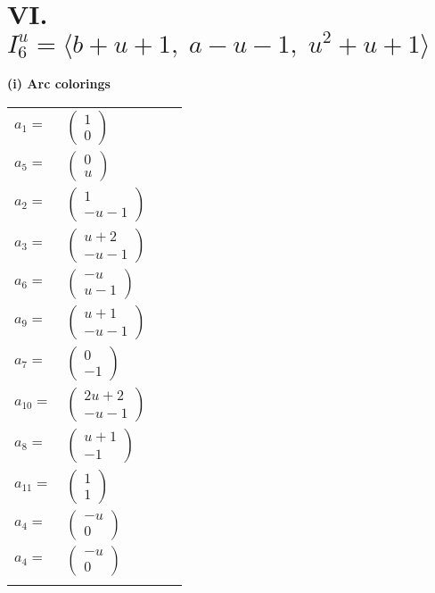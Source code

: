 \documentclass[1p]{elsarticle_modified}
\theoremstyle{definition}
\begin{document}
\centering \section*{VI. $I^u_{6}= \langle b+u+1,\;a- u-1,\;u^2+u+1 \rangle$}
\flushleft \textbf{(i) Arc colorings}\\
\begin{tabular}{m{7pt} m{180pt} m{7pt} m{180pt} }
\flushright $a_{1}=$&$\begin{pmatrix}1\\0\end{pmatrix}$ \\
\flushright $a_{5}=$&$\begin{pmatrix}0\\u\end{pmatrix}$ \\
\flushright $a_{2}=$&$\begin{pmatrix}1\\- u-1\end{pmatrix}$ \\
\flushright $a_{3}=$&$\begin{pmatrix}u+2\\- u-1\end{pmatrix}$ \\
\flushright $a_{6}=$&$\begin{pmatrix}- u\\u-1\end{pmatrix}$ \\
\flushright $a_{9}=$&$\begin{pmatrix}u+1\\- u-1\end{pmatrix}$ \\
\flushright $a_{7}=$&$\begin{pmatrix}0\\-1\end{pmatrix}$ \\
\flushright $a_{10}=$&$\begin{pmatrix}2 u+2\\- u-1\end{pmatrix}$ \\
\flushright $a_{8}=$&$\begin{pmatrix}u+1\\-1\end{pmatrix}$ \\
\flushright $a_{11}=$&$\begin{pmatrix}1\\1\end{pmatrix}$ \\
\flushright $a_{4}=$&$\begin{pmatrix}- u\\0\end{pmatrix}$\\ \flushright $a_{4}=$&$\begin{pmatrix}- u\\0\end{pmatrix}$\\&\end{tabular}
\end{document}
